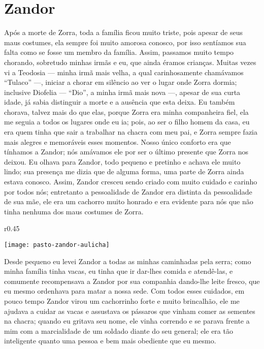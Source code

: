 \cleardoublepage
\newpage
\ifdefined\EnableIncludeImages
\fi
\chapter{Zandor}

Após a morte de Zorra, toda a família ficou muito triste, pois apesar de seus maus costumes, ela sempre foi muito amorosa conosco, por isso sentíamos sua falta como se fosse um membro da família. 
Assim, passamos muito tempo chorando, sobretudo minhas irmãs e eu, que ainda éramos crianças. 
Muitas vezes vi a Teodosia ---  minha irmã mais velha, a qual carinhosamente chamávamos ``Tulaco'' ---, iniciar a chorar em silêncio ao ver o lugar onde Zorra dormia; inclusive Diofelia  --- ``Dio'', a minha irmã mais nova ---, apesar de sua curta idade, já sabia distinguir a morte e a ausência que esta deixa. 
Eu também chorava, talvez mais do que elas, porque Zorra era minha companheira fiel, ela me seguia a todos os lugares onde eu ia; pois, ao ser o filho homem da casa, eu era quem tinha que sair a trabalhar na chacra com meu pai, e Zorra sempre fazia mais alegres e memoráveis esses momentos.
Nosso único conforto era que tínhamos a Zandor; nós amávamos ele por ser o último presente que Zorra nos deixou.
Eu olhava para Zandor, todo pequeno e pretinho e achava ele muito lindo; sua presença me dizia que de alguma forma, uma parte de Zorra ainda estava conosco. 
Assim, Zandor cresceu sendo criado com muito cuidado e carinho por todos nós;
entretanto a pessoalidade de Zandor era distinta da pessoalidade de sua mãe, ele era um cachorro muito honrado e era evidente para nós que não tinha nenhuma dos maus costumes de Zorra. 
\ifdefined\EnableIncludeImages
\begin{wrapfigure}{r}{0.45\textwidth}
  \begin{center}
  \vspace{-20pt}
    \texttt{[image: pasto-zandor-aulicha]}
  \end{center}
  \vspace{-20pt}
\end{wrapfigure}
\fi
Desde pequeno eu levei Zandor a todas as minhas caminhadas pela serra; como minha família tinha vacas, eu tinha que ir dar-lhes comida e atendê-las, e comumente recompensava a Zandor por sua companhia dando-lhe leite fresco, que eu mesmo ordenhava para matar a nossa sede. 
Com todos esses cuidados, em pouco tempo Zandor virou um cachorrinho forte e muito brincalhão,
ele me ajudava a cuidar as vacas e assustava os pássaros que vinham comer as sementes na chacra; quando eu gritava seu nome, ele vinha correndo e se parava frente a mim com a marcialidade de um soldado diante do seu general; ele era tão inteligente quanto uma pessoa e bem mais obediente que eu mesmo.

